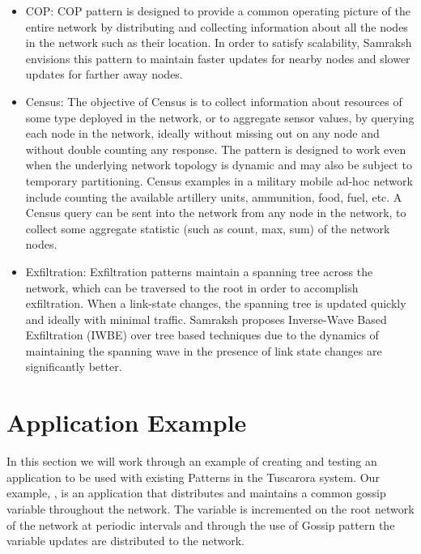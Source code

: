 \begin{itemize}
\item COP: COP pattern is designed to provide a common operating picture of the entire network by distributing and collecting information about all the nodes in the network such as their location. In order to satisfy scalability, Samraksh envisions this pattern to maintain faster updates for nearby nodes and slower updates for farther away nodes. 

\item Census: The objective of Census is to collect information about resources of some type
deployed in the network, or to aggregate sensor values, by querying each node in the network,
ideally without missing out on any node and without double counting any response. The pattern
is designed to work even when the underlying network topology is dynamic and may also be
subject to temporary partitioning. Census examples in a military mobile ad-hoc network include
counting the available artillery units, ammunition, food, fuel, etc. A Census query can be sent into the network from any node in the network, to collect some
aggregate statistic (such as count, max, sum) of the network nodes.

\item Exfiltration: Exfiltration patterns maintain a spanning tree across the network, which can be traversed
to the root in order to accomplish exfiltration. When a link-state changes, the spanning tree is
updated quickly and ideally with minimal traffic. Samraksh proposes Inverse-Wave Based Exfiltration (IWBE) over tree based techniques due to the dynamics of maintaining the spanning wave in the presence
of link state changes are significantly better.


\end{itemize}

\section{Application Example}

In this section we will work through an example of creating and
testing an application to be used with existing Patterns in the Tuscarora system. 
Our example, , is an application that distributes and maintains a common gossip variable throughout the network. 
The variable is incremented on the root network of the network at periodic intervals and through the use of Gossip pattern the variable updates are distributed to the network. 

